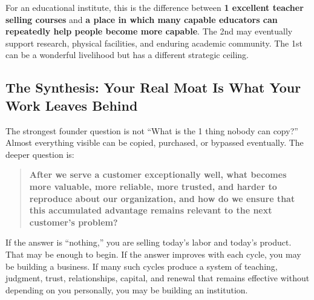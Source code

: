 For an educational institute, this is the difference between \textbf{1 excellent teacher selling courses} and \textbf{a place in which many capable educators can repeatedly help people become more capable}. The 2nd may eventually support research, physical facilities, and enduring academic community. The 1st can be a wonderful livelihood but has a different strategic ceiling.

\subsection{The Synthesis: Your Real Moat Is What Your Work Leaves Behind}
\label{sec:synthesis_moat_leaves_behind}

The strongest founder question is not ``What is the 1 thing nobody can copy?'' Almost everything visible can be copied, purchased, or bypassed eventually. The deeper question is:
\begin{quote}
\textbf{After we serve a customer exceptionally well, what becomes more valuable, more reliable, more trusted, and harder to reproduce about our organization, and how do we ensure that this accumulated advantage remains relevant to the next customer's problem?}
\end{quote}

If the answer is ``nothing,'' you are selling today's labor and today's product. That may be enough to begin. If the answer improves with each cycle, you may be building a business. If many such cycles produce a system of teaching, judgment, trust, relationships, capital, and renewal that remains effective without depending on you personally, you may be building an institution.
